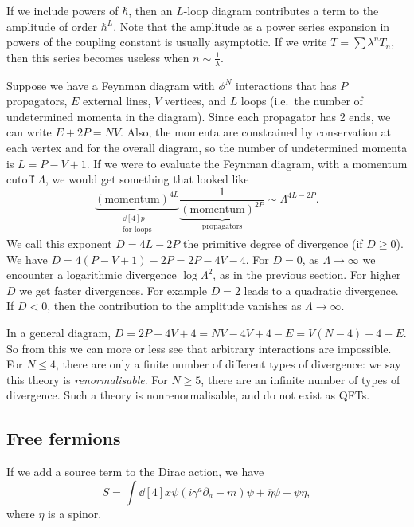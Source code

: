 \documentclass{jknotes} %
\begin{document}
If we include powers of \(\hbar\), then an \(L\)-loop diagram contributes a term to the amplitude of order \(\hbar^L\). Note that the amplitude as a power series expansion in powers of the coupling constant is usually asymptotic. If we write \(T=\sum\lambda^nT_n\), then this series becomes useless when \(n\sim\frac{1}{\lambda}\).

Suppose we have a Feynman diagram with \(\phi^N\) interactions that has \(P\) propagators, \(E\) external lines, \(V\) vertices, and \(L\) loops (i.e.\ the number of undetermined momenta in the diagram). Since each propagator has 2 ends, we can write \(E+2P=NV\). Also, the momenta are constrained by conservation at each vertex and for the overall diagram, so the number of undetermined momenta is \(L=P-V+1\). If we were to evaluate the Feynman diagram, with a momentum cutoff \(\Lambda\), we would get something that looked like
\begin{equation}
    \underbrace{(\text{momentum})^{4L}}_{\substack{\dd[4]{p}\\\text{for loops}}} \underbrace{\frac{1}{(\text{momentum})^{2P}}}_{\text{propagators}} \sim \Lambda^{4L-2P}.
\end{equation}
We call this exponent \(D=4L-2P\) the primitive degree of divergence (if \(D\ge0\)). We have \(D = 4(P-V+1)-2P = 2P-4V-4\). For \(D=0\), as \(\Lambda\to\infty\) we encounter a logarithmic divergence \(\log\Lambda^2\), as in the previous section. For higher \(D\) we get faster divergences. For example \(D=2\) leads to a quadratic divergence. If \(D<0\), then the contribution to the amplitude vanishes as \(\Lambda \to \infty\).

In a general diagram, \(D = 2P-4V+4 = NV-4V+4-E = V(N-4)+4-E\). So from this we can more or less see that arbitrary interactions are impossible. For \(N \le 4\), there are only a finite number of different types of divergence: we say this theory is \emph{renormalisable}. For \(N \ge 5\), there are an infinite number of types of divergence. Such a theory is nonrenormalisable, and do not exist as QFTs.

\subsection{Free fermions}
If we add a source term to the Dirac action, we have
\begin{equation}
    S = \int\dd[4]{x} \overline{\psi}(i\gamma^a\partial_a - m)\psi + \overline{\eta}\psi + \overline{\psi}\eta,
\end{equation}
where \(\eta\) is a spinor.
\end{document}
